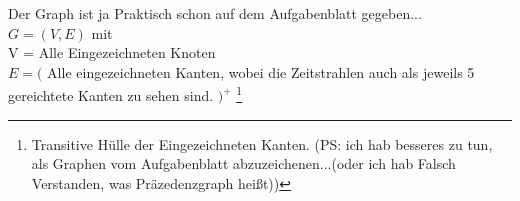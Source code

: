 Der Graph ist ja Praktisch schon auf dem Aufgabenblatt gegeben...\\
$G= (V,E)$ mit\\
V = Alle Eingezeichneten Knoten\\
$E=($ Alle eingezeichneten Kanten, wobei die Zeitstrahlen auch als jeweils 5 gereichtete Kanten zu sehen sind.
$)^+$
\footnote{Transitive Hülle der Eingezeichneten Kanten. (PS: ich hab besseres zu tun, als Graphen vom Aufgabenblatt abzuzeichenen...(oder ich hab Falsch Verstanden, was Präzedenzgraph heißt))}

